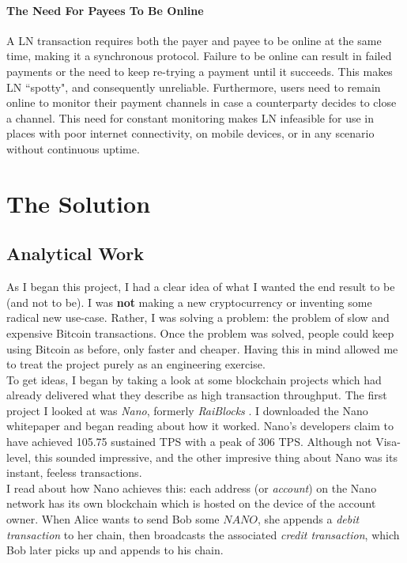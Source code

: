\documentclass{report}
\begin{document}
	\subsubsection{The Need For Payees To Be Online}
	A LN transaction requires both the payer and payee to be online at the same time, making it a synchronous protocol.  Failure to be online can result in failed payments or the need to keep re-trying a payment until it succeeds. This makes LN ``spotty", and consequently unreliable. Furthermore, users need to remain online to monitor their payment channels  in case a counterparty  decides to close a channel.  This need for constant monitoring makes LN infeasible for use in places with poor internet connectivity, on mobile devices, or in any scenario without continuous uptime.
	
\chapter{The Solution}
	\section{Analytical Work}
	As I began this project, I had a clear idea of what I wanted the end result to be (and not to be). I was \textbf{not} making a new cryptocurrency or inventing some radical new use-case. Rather, I was solving a problem: the problem of slow and expensive Bitcoin transactions. Once the problem was solved, people could keep using Bitcoin as before, only faster and cheaper. Having this in mind allowed me to treat the project purely as an engineering exercise. \\
	 
	To get ideas, I began by taking a look at some blockchain projects which had already delivered what they describe as high transaction throughput. The first project I looked at was \textit{Nano}, formerly \textit{RaiBlocks} \cite{nano}. I downloaded the Nano whitepaper and began reading about how it worked. Nano's developers claim to have achieved 105.75 sustained TPS with a peak of 306 TPS. \cite{nanowiki} Although not Visa-level, this sounded impressive, and the other impresive thing about Nano was its instant, feeless transactions. \\
	
	I read about how Nano achieves this: each address (or \textit{account}) on the Nano network has its own blockchain which is hosted on the device of the account owner. When Alice wants to send Bob some $NANO$, she appends a \textit{debit transaction} to her chain, then broadcasts the associated \textit{credit transaction}, which Bob later picks up and appends to his chain.  \\
	
\end{document}
